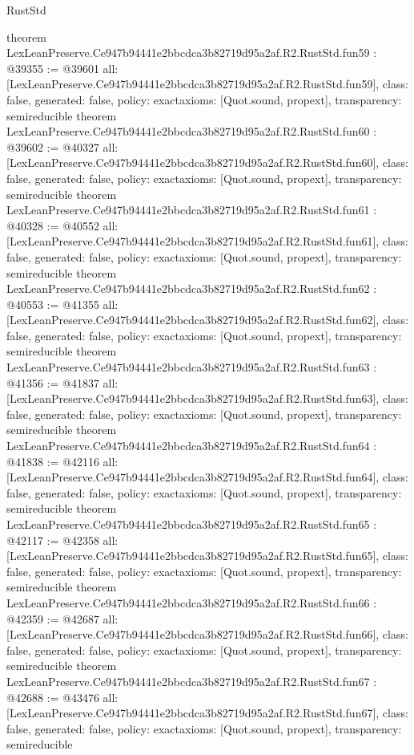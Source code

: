 \begin{lexlean}{RustStd}
\begin{coremodule}
{}
theorem LexLeanPreserve.Ce947b94441e2bbcdca3b82719d95a2af.R2.RustStd.fun59 : @39355 := @39601 {
  all: [LexLeanPreserve.Ce947b94441e2bbcdca3b82719d95a2af.R2.RustStd.fun59],
  class: false,
  generated: false,
  policy: exact{axioms: [Quot.sound, propext]},
  transparency: semireducible
}
theorem LexLeanPreserve.Ce947b94441e2bbcdca3b82719d95a2af.R2.RustStd.fun60 : @39602 := @40327 {
  all: [LexLeanPreserve.Ce947b94441e2bbcdca3b82719d95a2af.R2.RustStd.fun60],
  class: false,
  generated: false,
  policy: exact{axioms: [Quot.sound, propext]},
  transparency: semireducible
}
theorem LexLeanPreserve.Ce947b94441e2bbcdca3b82719d95a2af.R2.RustStd.fun61 : @40328 := @40552 {
  all: [LexLeanPreserve.Ce947b94441e2bbcdca3b82719d95a2af.R2.RustStd.fun61],
  class: false,
  generated: false,
  policy: exact{axioms: [Quot.sound, propext]},
  transparency: semireducible
}
theorem LexLeanPreserve.Ce947b94441e2bbcdca3b82719d95a2af.R2.RustStd.fun62 : @40553 := @41355 {
  all: [LexLeanPreserve.Ce947b94441e2bbcdca3b82719d95a2af.R2.RustStd.fun62],
  class: false,
  generated: false,
  policy: exact{axioms: [Quot.sound, propext]},
  transparency: semireducible
}
theorem LexLeanPreserve.Ce947b94441e2bbcdca3b82719d95a2af.R2.RustStd.fun63 : @41356 := @41837 {
  all: [LexLeanPreserve.Ce947b94441e2bbcdca3b82719d95a2af.R2.RustStd.fun63],
  class: false,
  generated: false,
  policy: exact{axioms: [Quot.sound, propext]},
  transparency: semireducible
}
theorem LexLeanPreserve.Ce947b94441e2bbcdca3b82719d95a2af.R2.RustStd.fun64 : @41838 := @42116 {
  all: [LexLeanPreserve.Ce947b94441e2bbcdca3b82719d95a2af.R2.RustStd.fun64],
  class: false,
  generated: false,
  policy: exact{axioms: [Quot.sound, propext]},
  transparency: semireducible
}
theorem LexLeanPreserve.Ce947b94441e2bbcdca3b82719d95a2af.R2.RustStd.fun65 : @42117 := @42358 {
  all: [LexLeanPreserve.Ce947b94441e2bbcdca3b82719d95a2af.R2.RustStd.fun65],
  class: false,
  generated: false,
  policy: exact{axioms: [Quot.sound, propext]},
  transparency: semireducible
}
theorem LexLeanPreserve.Ce947b94441e2bbcdca3b82719d95a2af.R2.RustStd.fun66 : @42359 := @42687 {
  all: [LexLeanPreserve.Ce947b94441e2bbcdca3b82719d95a2af.R2.RustStd.fun66],
  class: false,
  generated: false,
  policy: exact{axioms: [Quot.sound, propext]},
  transparency: semireducible
}
theorem LexLeanPreserve.Ce947b94441e2bbcdca3b82719d95a2af.R2.RustStd.fun67 : @42688 := @43476 {
  all: [LexLeanPreserve.Ce947b94441e2bbcdca3b82719d95a2af.R2.RustStd.fun67],
  class: false,
  generated: false,
  policy: exact{axioms: [Quot.sound, propext]},
  transparency: semireducible
}
\end{coremodule}
\end{lexlean}
